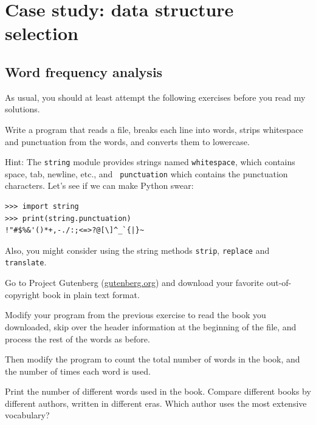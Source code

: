 \documentclass[10pt]{book}
\begin{document}




\chapter{Case study: data structure selection}

\section{Word frequency analysis}
\label{analysis}

As usual, you should at least attempt the following exercises
before you read my solutions.

\begin{ex}
Write a program that reads a file, breaks each line into
words, strips whitespace and punctuation from the words, and
converts them to lowercase.


Hint: The {\tt string} module provides strings named {\tt whitespace},
which contains space, tab, newline, etc., and {\tt
  punctuation} which contains the punctuation characters.  Let's see
if we can make Python swear:

\beforeverb
\begin{verbatim}
>>> import string
>>> print(string.punctuation)
!"#$%&'()*+,-./:;<=>?@[\]^_`{|}~
\end{verbatim}
\afterverb
%
Also, you might consider using the string methods {\tt strip},
{\tt replace} and {\tt translate}.


\end{ex}


\begin{ex}


Go to Project Gutenberg (\url{gutenberg.org}) and download 
your favorite out-of-copyright book in plain text format.


Modify your program from the previous exercise to read the book
you downloaded, skip over the header information at the beginning
of the file, and process the rest of the words as before.

Then modify the program to count the total number of words in
the book, and the number of times each word is used.


Print the number of different words used in the book.  Compare
different books by different authors, written in different eras.
Which author uses the most extensive vocabulary?
\end{ex}
\end{document}

